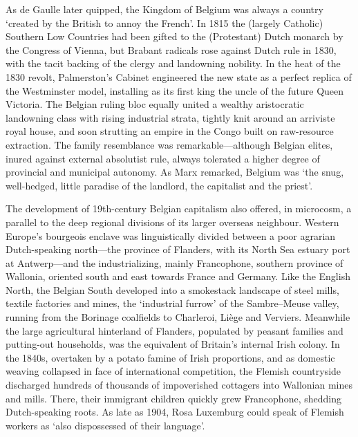\documentclass[
]{book}
\begin{document}
As de Gaulle later quipped, the Kingdom of Belgium was always a country `created by the British to annoy the French'. In 1815 the (largely Catholic) Southern Low Countries had been gifted to the (Protestant) Dutch monarch by the Congress of Vienna, but Brabant radicals rose against Dutch rule in 1830, with the tacit backing of the clergy and landowning nobility. In the heat of the 1830 revolt, Palmerston's Cabinet engineered the new state as a perfect replica of the Westminster model, installing as its first king the uncle of the future Queen Victoria. The Belgian ruling bloc equally united a wealthy aristocratic landowning class with rising industrial strata, tightly knit around an arriviste royal house, and soon strutting an empire in the Congo built on raw-resource extraction. The family resemblance was remarkable---although Belgian elites, inured against external absolutist rule, always tolerated a higher degree of provincial and municipal autonomy. As Marx remarked, Belgium was `the snug, well-hedged, little paradise of the landlord, the capitalist and the priest'.

The development of 19th-century Belgian capitalism also offered, in microcosm, a parallel to the deep regional divisions of its larger overseas neighbour. Western Europe's bourgeois enclave was linguistically divided between a poor agrarian Dutch-speaking north---the province of Flanders, with its North Sea estuary port at Antwerp---and the industrializing, mainly Francophone, southern province of Wallonia, oriented south and east towards France and Germany. Like the English North, the Belgian South developed into a smokestack landscape of steel mills, textile factories and mines, the `industrial furrow' of the Sambre--Meuse valley, running from the Borinage coalfields to Charleroi, Liège and Verviers. Meanwhile the large agricultural hinterland of Flanders, populated by peasant families and putting-out households, was the equivalent of Britain's internal Irish colony. In the 1840s, overtaken by a potato famine of Irish proportions, and as domestic weaving collapsed in face of international competition, the Flemish countryside discharged hundreds of thousands of impoverished cottagers into Wallonian mines and mills. There, their immigrant children quickly grew Francophone, shedding Dutch-speaking roots. As late as 1904, Rosa Luxemburg could speak of Flemish workers as `also dispossessed of their language'.
\end{document}
